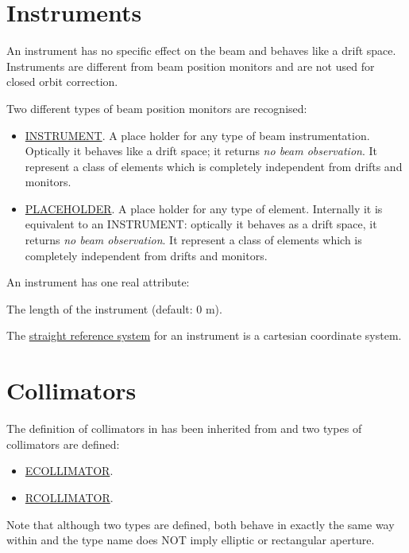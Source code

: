 \section{Instruments}
\label{sec:instruments}

An instrument has no specific effect on the beam and behaves like a
drift space. 
Instruments are different from beam position monitors and are not used
for closed orbit correction. 

Two different types of beam position monitors are recognised:  

\begin{itemize}
   \item \href{inst}{INSTRUMENT}. A place holder for any type of beam
     instrumentation. Optically it behaves like a drift space; it
     returns \emph{no beam observation}. It represent a class of
     elements which is completely independent from drifts and monitors.  
   \item \href{plac}{PLACEHOLDER}. A place holder for any type of
     element. Internally it is equivalent to an INSTRUMENT: optically it
     behaves as a drift space, it returns \emph{no beam observation}. It
     represent a class of elements which is completely independent from
     drifts and monitors. 
\end{itemize}


An instrument has one real attribute: 
\begin{madlist}
    The length of the instrument (default: 0 m). 
\end{madlist}

The \href{local_system.html#straight}{straight reference system} for an 
instrument is a cartesian coordinate system.  


\section{Collimators}
 
The definition of collimators in \madx has been inherited from \madeight
and two types of collimators are defined:  
\begin{itemize}
   \item \href{ecol}{ECOLLIMATOR}. 
   \item \href{rcol}{RCOLLIMATOR}. 
\end{itemize}  
Note that although two types are defined, both behave in exactly the
same way within \madx and the type name does NOT imply elliptic or
rectangular aperture.    

